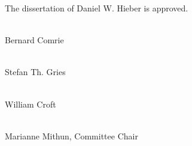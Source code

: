 \setlength{\parindent}{0em}
\def\signaturepadding{2.5em}
\thispagestyle{empty}

\begin{center}
  The dissertation of Daniel W. Hieber is approved.
\end{center}
\vspace{\signaturepadding}

\hrulefill\\
Bernard Comrie
\vspace{\signaturepadding}

\hrulefill\\
Stefan Th. Gries
\vspace{\signaturepadding}

\hrulefill\\
William Croft
\vspace{\signaturepadding}

\hrulefill\\
Marianne Mithun, Committee Chair
\vspace{\signaturepadding}

\begin{center}
  \thedate
\end{center}

\setlength{\parindent}{\defaultindent}
\restoregeometry
